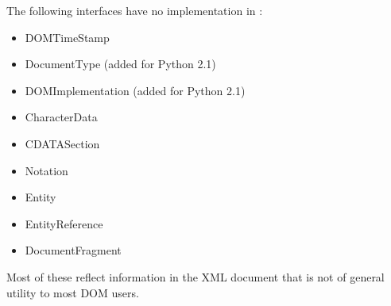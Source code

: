The following interfaces have no implementation in
:

\begin{itemize}
\item DOMTimeStamp

\item DocumentType (added for Python 2.1)

\item DOMImplementation (added for Python 2.1)

\item CharacterData

\item CDATASection

\item Notation

\item Entity

\item EntityReference

\item DocumentFragment
\end{itemize}

Most of these reflect information in the XML document that is not of
general utility to most DOM users.
